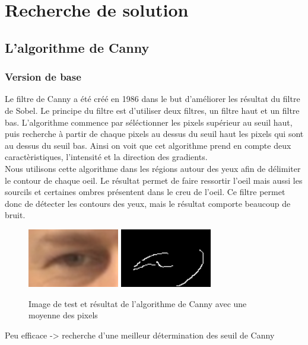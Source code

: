 \section{Recherche de solution}

\subsection{L'algorithme de Canny}

\subsubsection{Version de base}
Le filtre de Canny a été créé en 1986 dans le but d'améliorer les résultat du filtre de Sobel.
Le principe du filtre est d'utiliser deux filtres, un filtre haut et un filtre bas. L'algorithme
commence par séléctionner les pixels supérieur au seuil haut, puis recherche à partir de chaque
pixels au dessus du seuil haut les pixels qui sont au dessus du seuil bas. Ainsi on voit 
que cet algorithme prend en compte deux caractèristiques, l'intensité et la direction des 
gradients.\\

Nous utilisons cette algorithme dans les régions autour des yeux afin de délimiter le contour
de chaque oeil. Le résultat permet de faire ressortir l'oeil mais aussi les sourcils et certaines
ombres présentent dans le creu de l'oeil. Ce filtre permet donc de détecter les contours des yeux,
mais le résultat comporte beaucoup de bruit. 

\begin{figure}[H]
 \center
 \includegraphics[width=4cm]{image/original.png}
 \includegraphics[width=4cm]{image/canny_moyenne.png}
 \caption{Image de test et résultat de l'algorithme de Canny avec une moyenne des pixels}
\end{figure}

Peu efficace -> recherche d'une meilleur détermination des seuil de Canny

